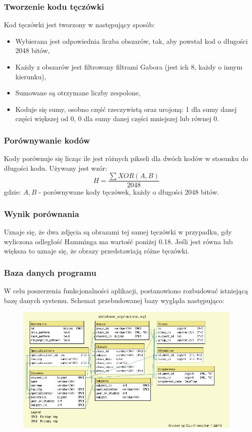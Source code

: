 \documentclass{beamer}
\begin{document}
\begin{frame}
\frametitle{Tworzenie kodu tęczówki}
Kod tęczówki jest tworzony w następujący sposób:
\begin{itemize}
\item Wybierana jest odpowiednia liczba obszarów, tak, aby powstał kod o długości 2048 bitów,
\item Każdy z obszarów jest filtrowany filtrami Gabora (jest ich 8, każdy o innym kierunku),
\item Sumowane są otrzymane liczby zespolone,
\item Koduje się sumy, osobno część rzeczywistą oraz urojoną: 1 dla sumy danej części większej od 0, 0 dla sumy danej części mniejszej lub równej 0.
\end{itemize}
\end{frame}


\begin{frame}
\frametitle{Porównywanie kodów}
Kody porównuje się licząc ile jest różnych pikseli dla dwóch kodów w stosunku do długości kodu. Używany jest wzór:
$$ H = \frac{\sum XOR(A,B)}{2048} $$
gdzie:
$A, B$ - porównywane kody tęczówek, każdy o długości 2048 bitów.\\
\end{frame}


\begin{frame}
\frametitle{Wynik porównania}
Uznaje się, że dwa zdjęcia są obrazami tej samej tęczówki w przypadku, gdy wyliczona odległość Hamminga ma wartość poniżej 0.18. Jeśli jest równa lub większa to uznaje się, że obrazy przedstawiają różne tęczówki.
\end{frame}

\begin{frame}
\frametitle{Baza danych programu}
W celu poszerzenia funkcjonalności aplikacji, postanowiono rozbudować istniejącą bazę danych systemu. Schemat przebudowanej bazy wygląda następująco:

\begin{figure}
\includegraphics{diagram.png}
\end{figure}
\end{frame}
\end{document}
